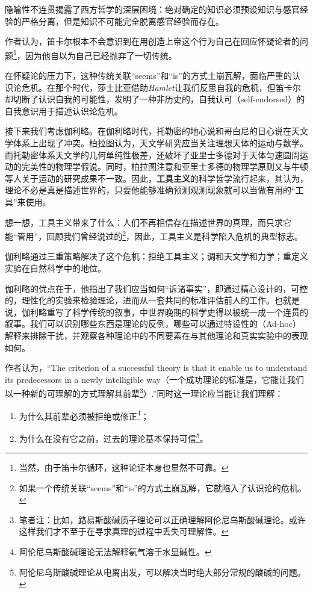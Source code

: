 \documentclass[12pt, a4paper, oneside]{ctexart}
\renewcommand{\b}{\textbf}
\newcommand{\f}{\footnote}
\begin{document}
隐喻性不连贯揭露了西方哲学的深层困境：绝对确定的知识必须预设知识与感官经验的严格分离，但是知识不可能完全脱离感官经验而存在。

作者认为，笛卡尔根本不会意识到在用创造上帝这个行为自己在回应怀疑论者的问题\f{当然，由于笛卡尔循环，这种论证本身也显然不可靠。}，因为他自以为自己已经抛弃了一切传统。

在怀疑论的压力下，这种传统关联“seems”和“is”的方式土崩瓦解，面临严重的认识论危机。在那个时代，莎士比亚借助\textit{Hamlet}让我们反思自我的危机，但笛卡尔却切断了认识自我的可能性，发明了一种非历史的，自我认可（self-endorsed）的自我意识用于描述认识论危机。

接下来我们考虑伽利略。在伽利略时代，托勒密的地心说和哥白尼的日心说在天文学体系上出现了冲突。柏拉图认为，天文学研究应当关注理想天体的运动与数学。而托勒密体系天文学的几何单纯性极差，还破坏了亚里士多德对于天体匀速圆周运动的完美性的物理学假说。同时，柏拉图注意和亚里士多德的物理学原则又与牛顿等人关于运动的研究成果不一致。因此，\b{工具主义}的科学哲学流行起来，其认为，理论不必是真是描述世界的，只要他能够准确预测观测现象就可以当做有用的“工具”来使用。

想一想，工具主义带来了什么：人们不再相信存在描述世界的真理，而只求它能“管用”，回顾我们曾经说过的\f{如果一个传统关联“seems”和“is”的方式土崩瓦解，它就陷入了认识论的危机。}，因此，工具主义是科学陷入危机的典型标志。

伽利略通过三重策略解决了这个危机：拒绝工具主义；调和天文学和力学；重定义实验在自然科学中的地位。

伽利略的优点在于，他指出了我们应当如何“诉诸事实”，即通过精心设计的，可控的，理性化的实验来检验理论，进而从一套共同的标准评估前人的工作。也就是说，伽利略重写了科学传统的叙事，中世界晚期的科学史得以被统一成一个连贯的叙事。我们可以识别哪些东西是理论的反例，哪些可以通过特设性的（Ad-hoc）解释来排除干扰，并观察各种理论中的不同要素在与其他理论和真实实验中的表现如何。

作者认为，“The criterion of a successful theory is that it enable us to understand its predecessors in a newly intelligible way（一个成功理论的标准是，它能让我们以一种新的可理解的方式理解其前辈\f{笔者注：比如，路易斯酸碱质子理论可以正确理解阿伦尼乌斯酸碱理论。或许这样我们才不至于在寻求真理的过程中丢失可理解性。}）.”同时这一理论应当能让我们理解：

\begin{enumerate}
    \item 为什么其前辈必须被拒绝或修正\f{阿伦尼乌斯酸碱理论无法解释氨气溶于水显碱性。}；
    \item 为什么在没有它之前，过去的理论基本保持可信\f{阿伦尼乌斯酸碱理论从电离出发，可以解决当时绝大部分常规的酸碱的问题。}。
\end{enumerate}
\end{document}
